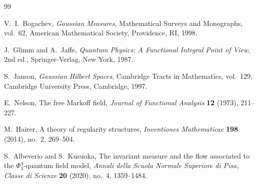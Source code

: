 \documentclass[12pt]{article}
\begin{document}
\begin{thebibliography}{99}

V.~I.~Bogachev,
\textit{Gaussian Measures},
Mathematical Surveys and Monographs, vol.~62,
American Mathematical Society, Providence, RI, 1998.

J.~Glimm and A.~Jaffe,
\textit{Quantum Physics: A Functional Integral Point of View},
2nd ed., Springer-Verlag, New York, 1987.

S.~Janson,
\textit{Gaussian Hilbert Spaces},
Cambridge Tracts in Mathematics, vol.~129,
Cambridge University Press, Cambridge, 1997.

E.~Nelson,
The free Markoff field,
\textit{Journal of Functional Analysis} \textbf{12} (1973), 211--227.

M.~Hairer,
A theory of regularity structures,
\textit{Inventiones Mathematicae} \textbf{198} (2014), no.~2, 269--504.

S.~Albeverio and S.~Kusuoka,
The invariant measure and the flow associated to the $\Phi^4_3$-quantum field model,
\textit{Annali della Scuola Normale Superiore di Pisa, Classe di Scienze}
\textbf{20} (2020), no.~4, 1359--1484.

\end{thebibliography}
\end{document}
